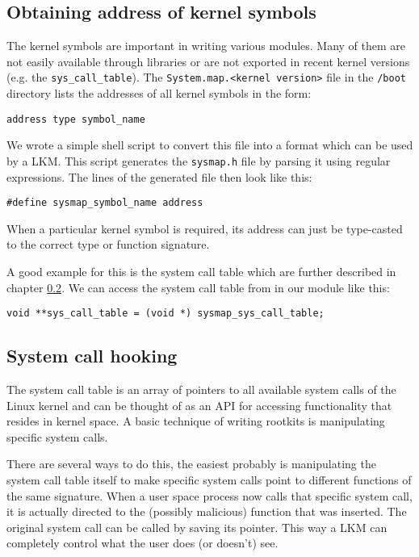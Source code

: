 \documentclass[10pt, letterpaper]{scrartcl}
\begin{document}
\subsection{Obtaining address of kernel symbols}
The kernel symbols are important in writing various modules.
Many of them are not easily available through libraries or are not exported in recent kernel versions (e.g. the \texttt{sys\_call\_table}).
The \texttt{System.map.<kernel version>} file in the \texttt{/boot} directory lists the addresses of all kernel symbols in the form:
\begin{verbatim}
address type symbol_name
\end{verbatim}

We wrote a simple shell script to convert this file into a format which can be used by a LKM.
This script generates the \texttt{sysmap.h} file by parsing it using regular expressions. 
The lines of the generated file then look like this:

\begin{verbatim}
#define sysmap_symbol_name address
\end{verbatim}

When a particular kernel symbol is required, its address can just be type-casted to the correct type or function signature. 

A good example for this is the system call table which are further described in chapter \ref{sec:implementation_system_call_hooking}.
We can access the system call table from in our module like this:

\begin{verbatim}
void **sys_call_table = (void *) sysmap_sys_call_table;
\end{verbatim}

\subsection{System call hooking}\label{sec:implementation_system_call_hooking}
The system call table is an array of pointers to all available system calls of the Linux kernel and can be thought of as an API for accessing functionality that resides in kernel space.
A basic technique of writing rootkits is manipulating specific system calls.

There are several ways to do this, the easiest probably is manipulating the system call table itself to make specific system calls point to different functions of the same signature.
When a user space process now calls that specific system call, it is actually directed to the (possibly malicious) function that was inserted.
The original system call can be called by saving its pointer. This way a LKM can completely control what the user does (or doesn't) see.
\end{document}
